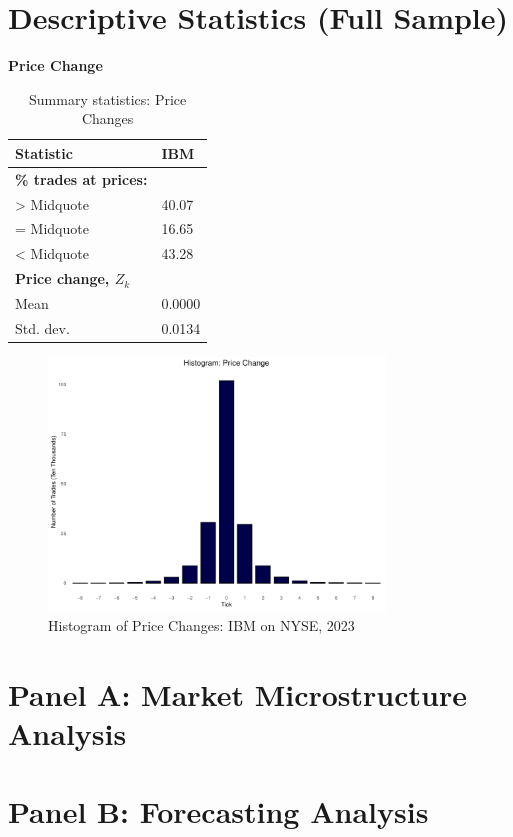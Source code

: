 \section{Descriptive Statistics (Full Sample)}

{\noindent\bfseries Price Change }
\begin{table}[htbp]
\centering
\begin{tabular}{ll}
\toprule
\textbf{Statistic} & \textbf{IBM}\\
\midrule
\textbf{\% trades at prices:} & \\
> Midquote & 40.07\\
= Midquote & 16.65\\
< Midquote & 43.28\\
\textbf{Price change, $Z_k$} & \\
Mean & 0.0000\\
Std. dev. & 0.0134\\
\bottomrule
\end{tabular}
\caption{Summary statistics: Price Changes}
\label{tab:3}
\end{table}

\begin{figure}[htbp]
    \centering
    \includegraphics[width=0.8\textwidth]{figures/descriptive stat/price_change_IBM_N_2023.pdf}
    \caption{Histogram of Price Changes: IBM on NYSE, 2023}
    \label{fig:price-change-2023}
\end{figure}


\section{Panel A: Market Microstructure Analysis}

\section{Panel B: Forecasting Analysis}